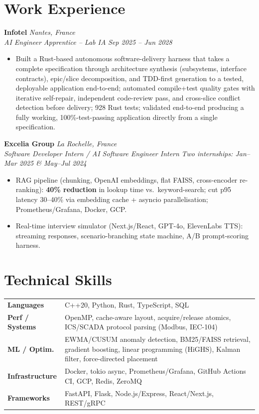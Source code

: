 \documentclass[10pt]{article}
\newcommand{\entry}[4]{%
  \noindent\textbf{#1} \hfill \textit{#2} \\
  \textit{#3} \hfill \textit{#4}\\[-0.22em]
}
\begin{document}
\section*{Work Experience}
\entry{Infotel}{Nantes, France}{AI Engineer Apprentice -- Lab IA}{Sep 2025 -- Jun 2028}
\begin{itemize}
  \item Built a Rust-based autonomous software-delivery harness that takes a complete specification through architecture synthesis (subsystems, interface contracts), epic/slice decomposition, and TDD-first generation to a tested, deployable application end-to-end; automated compile+test quality gates with iterative self-repair, independent code-review pass, and cross-slice conflict detection before delivery; 928 Rust tests; validated end-to-end producing a fully working, 100\%-test-passing application directly from a single specification.
\end{itemize}
\entry{Excelia Group}{La Rochelle, France}{Software Developer Intern / AI Software Engineer Intern}{Two internships: Jan--Mar 2025 \& May--Jul 2024}
\begin{itemize}
  \item RAG pipeline (chunking, OpenAI embeddings, flat FAISS, cross-encoder re-ranking): \textbf{40\% reduction} in lookup time vs.\ keyword-search; cut p95 latency 30--40\% via embedding cache + asyncio parallelisation; Prometheus/Grafana, Docker, GCP.
  \item Real-time interview simulator (Next.js/React, GPT-4o, ElevenLabs TTS): streaming responses, scenario-branching state machine, A/B prompt-scoring harness.
\end{itemize}

\section*{Technical Skills}
\noindent
\begin{tabular}{@{}p{2.7cm}p{15.5cm}@{}}
\textbf{Languages} & C++20, Python, Rust, TypeScript, SQL \\
\textbf{Perf / Systems} & OpenMP, cache-aware layout, acquire/release atomics, ICS/SCADA protocol parsing (Modbus, IEC-104) \\
\textbf{ML / Optim.} & EWMA/CUSUM anomaly detection, BM25/FAISS retrieval, gradient boosting, linear programming (HiGHS), Kalman filter, force-directed placement \\
\textbf{Infrastructure} & Docker, tokio async, Prometheus/Grafana, GitHub Actions CI, GCP, Redis, ZeroMQ \\
\textbf{Frameworks} & FastAPI, Flask, Node.js/Express, React/Next.js, REST/gRPC \\
\end{tabular}
\end{document}
